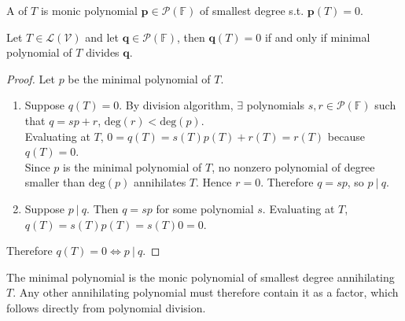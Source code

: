 \begin{definition} A  of $T$ is monic polynomial $\mathbf{p} \in \mathcal{P}(\mathbb{F})$ of smallest degree s.t. $\mathbf{p}(T) = 0$.
\end{definition}

\begin{theorem} \label{thm:minimalpolydivides} Let $T \in \mathcal{L}(\mathcal{V})$ and let $\mathbf{q} \in \mathcal{P}(\mathbb{F})$, then $\mathbf{q}(T) = 0$ if and only if minimal polynomial of $T$ divides $\mathbf{q}$.
\begin{proof} Let $p$ be the minimal polynomial of $T$.
\begin{enumerate}[label=\roman*.]
\setlength{\itemsep}{0pt}
\item[$(\Rightarrow)$] Suppose $q(T) = 0$. By division algorithm, $\exists$ polynomials $s, r \in \mathcal{P}(\mathbb{F})$ such that $q = sp + r$, $\text{deg}(r) < \text{deg}(p)$.\\
Evaluating at $T$, $0 = q(T) = s(T)p(T) + r(T) = r(T)$ because $q(T)=0$.\\
Since $p$ is the minimal polynomial of $T$, no nonzero polynomial of degree smaller than $\text{deg}(p)$ annihilates $T$. Hence $r=0$. Therefore $q = sp$, so $p \ \vert \ q$.
\item[$(\Leftarrow)$] Suppose $p \ \vert \ q$. Then $q = sp$ for some polynomial $s$. Evaluating at $T$, $q(T) = s(T) p(T) = s(T) 0 = 0$.
\end{enumerate}
Therefore $q(T) = 0 \Leftrightarrow p \ \vert \ q$.
\end{proof}
\end{theorem}

The minimal polynomial is the monic polynomial of smallest degree annihilating $T$. Any other annihilating polynomial must therefore contain it as a factor, which follows directly from polynomial division.

